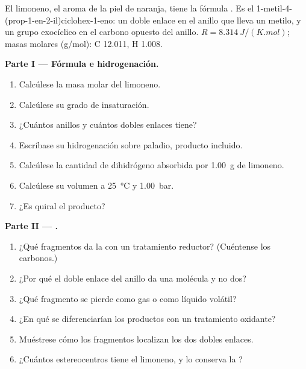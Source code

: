 \begin{problem}
\label{pb:b2:alkene-redox:1}
El limoneno, el aroma de la piel de naranja, tiene la fórmula . Es el
1-metil-4-(prop-1-en-2-il)ciclohex-1-eno: un doble enlace en el anillo que lleva un metilo, y un
grupo exocíclico  en el carbono opuesto del anillo. $R =
\qty{8.314}{J/(K.mol)}$; masas molares (\unit{g/mol}): C 12.011, H 1.008.

\medskip
\noindent\textbf{Parte I --- Fórmula e hidrogenación.}
\begin{enumerate}
  \item Calcúlese la masa molar del limoneno.
  \item Calcúlese su grado de insaturación.
  \item ¿Cuántos anillos y cuántos dobles enlaces tiene?
  \item Escríbase su hidrogenación sobre paladio, producto incluido.
  \item Calcúlese la cantidad de dihidrógeno absorbida por \qty{1.00}{g} de limoneno.
  \item Calcúlese su volumen a \qty{25}{\degreeCelsius} y \qty{1.00}{bar}.
  \item ¿Es quiral el producto?
\end{enumerate}

\medskip
\noindent\textbf{Parte II --- .}
\begin{enumerate}[resume]
  \item ¿Qué fragmentos da la  con un tratamiento reductor? (Cuéntense los carbonos.)
  \item ¿Por qué el doble enlace del anillo da una molécula y no dos?
  \item ¿Qué fragmento se pierde como gas o como líquido volátil?
  \item ¿En qué se diferenciarían los productos con un tratamiento oxidante?
  \item Muéstrese cómo los fragmentos localizan los dos dobles enlaces.
  \item ¿Cuántos estereocentros tiene el limoneno, y lo conserva la ?
\end{enumerate}


\end{problem}
